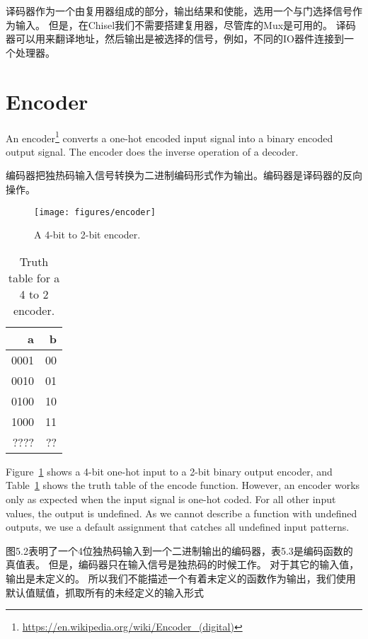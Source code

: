 \documentclass[%
    10pt,
    headinclude, footexclude,
    openright, %
    notitlepage,
    cleardoubleempty,
    headsepline,
    pointlessnumbers,
    bibtotoc, idxtotoc,
    ]{scrbook}
\newcommand{\scale}{0.7}
\newcommand{\myref}[2]{\href{#1}{#2}}
\renewcommand{\myref}[2]{{#2}{\footnote{\url{#1}}}}
\begin{document}
译码器作为一个由复用器组成的部分，输出结果和使能，选用一个与门选择信号作为输入。
但是，在Chisel我们不需要搭建复用器，尽管库的Mux是可用的。
译码器可以用来翻译地址，然后输出是被选择的信号，例如，不同的IO器件连接到一个处理器。


\section{Encoder}

An \myref{https://en.wikipedia.org/wiki/Encoder_(digital)}{encoder}
converts a one-hot encoded input signal into a binary encoded output signal.
The encoder does the inverse operation of a decoder.

编码器把独热码输入信号转换为二进制编码形式作为输出。编码器是译码器的反向操作。

\begin{figure}
  \centering
  \texttt{[image: figures/encoder]}
  \caption{A 4-bit to 2-bit encoder.}
  \label{fig:encoder}
\end{figure}


\begin{table}
 \centering
 \label{tab:encoder}
  \begin{tabular}{rr}
    \toprule
    a & b \\
    \midrule
    0001 & 00 \\
    0010 & 01 \\
    0100 & 10 \\
    1000 & 11 \\
    ???? & ?? \\
    \bottomrule 
  \end{tabular} 
  \caption{Truth table for a 4 to 2 encoder.}
\end{table}

Figure~\ref{fig:encoder} shows a 4-bit one-hot input to a 2-bit binary output encoder, and
Table~\ref{tab:encoder} shows the truth table of the encode function. However, an encoder
works only as expected when the input signal is one-hot coded. For all other input values, the output
is undefined. As we cannot describe a function with undefined outputs, we use a default
assignment that catches all undefined input patterns.

图5.2表明了一个4位独热码输入到一个二进制输出的编码器，表5.3是编码函数的真值表。
但是，编码器只在输入信号是独热码的时候工作。
对于其它的输入值，输出是未定义的。
所以我们不能描述一个有着未定义的函数作为输出，我们使用默认值赋值，抓取所有的未经定义的输入形式
\end{document}
